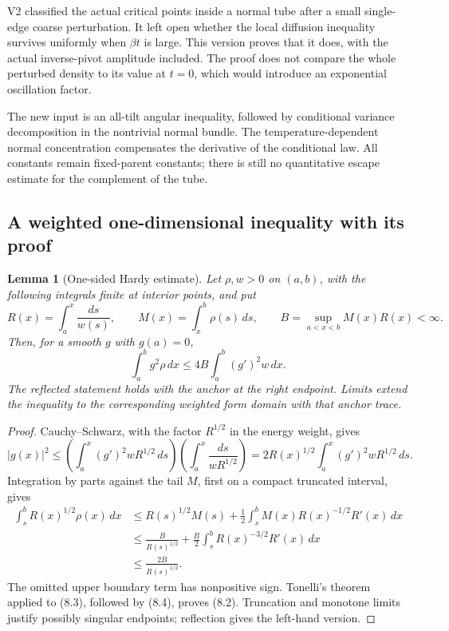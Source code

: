 \documentclass[11pt,oneside]{article}
\newtheorem{lemma}[theorem]{Lemma}
\begin{document}
V2 classified the actual critical points
inside a normal tube after a small
single-edge coarse perturbation. It
left open whether the local diffusion
inequality survives uniformly when
\(\beta t\) is large. This version
proves that it does, with the actual
inverse-pivot amplitude included.
The proof does not compare the whole
perturbed density to its value at
\(t=0\), which would introduce an
exponential oscillation factor.

The new input is an all-tilt angular
inequality, followed by conditional
variance decomposition in the
nontrivial normal bundle. The
temperature-dependent normal
concentration compensates the
derivative of the conditional law.
All constants remain fixed-parent
constants; there is still no
quantitative escape estimate for
the complement of the tube.

\subsection{A weighted one-dimensional inequality with its proof}

\begin{lemma}[One-sided Hardy estimate]
\label{lem:f13v3-hardy}
Let \(\rho,w>0\) on \((a,b)\),
with the following integrals
finite at interior points, and put
\[
 R(x)=\int_a^x\frac{ds}{w(s)},\qquad
 M(x)=\int_x^b\rho(s)\,ds,\qquad
 B=\sup_{a<x<b}M(x)R(x)<\infty.
 \tag{8.1}
\]
Then, for a smooth \(g\) with
\(g(a)=0\),
\[
                  \int_a^b g^2\rho\,dx
                         \le4B\int_a^b(g')^2w\,dx.
 \tag{8.2}
\]
The reflected statement holds
with the anchor at the right
endpoint. Limits extend the
inequality to the corresponding
weighted form domain with that
anchor trace.
\end{lemma}
\begin{proof}
Cauchy--Schwarz, with the
factor \(R^{1/2}\) in the
energy weight, gives
\[
 |g(x)|^2
 \le\left(\int_a^x(g')^2wR^{1/2}\,ds\right)
          \left(\int_a^x\frac{ds}{wR^{1/2}}\right)
 =2R(x)^{1/2}\int_a^x(g')^2wR^{1/2}\,ds.
 \tag{8.3}
\]
Integration by parts against the
tail \(M\), first on a compact
truncated interval, gives
\[
 \begin{split}
 \int_s^bR(x)^{1/2}\rho(x)\,dx
 &\le R(s)^{1/2}M(s)
             +\frac12\int_s^bM(x)R(x)^{-1/2}R'(x)\,dx\\
 &\le\frac{B}{R(s)^{1/2}}
             +\frac B2\int_s^bR(x)^{-3/2}R'(x)\,dx\\
 &\le\frac{2B}{R(s)^{1/2}}.
 \end{split}
 \tag{8.4}
\]
The omitted upper boundary term
has nonpositive sign. Tonelli's
theorem applied to (8.3), followed
by (8.4), proves (8.2).
Truncation and monotone limits
justify possibly singular
endpoints; reflection gives
the left-hand version.
\end{proof}
\end{document}

